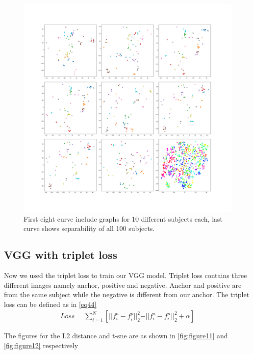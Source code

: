 \begin{figure}[htbp]
\centering
\includegraphics[scale=0.3]{./Chapter4/Figures/CLStsne_1}
\caption{First eight curve include graphs for 10 different subjects each, last curve shows separability of all 100 subjects.}
\label{fig:figure10}
\end{figure}

\subsection{VGG with triplet loss}
Now we used the triplet loss to train our VGG model. Triplet loss contains three different images namely anchor, positive and negative. Anchor and positive are from the same subject while the negative is different from our anchor. The triplet loss can be defined as in \ref{eq44}
\begin{equation}
	\begin{aligned}
		Loss = \sum^N_{i=1}[\vert\vert f^a_{i} - f^p_{i} \vert\vert^2_{2} - \vert\vert f^a_{i} - f^n_{i} \vert\vert^2_{2} + \alpha] 
\end{aligned}
\label{eq44}
\end{equation}

The figures for the L2 distance and t-sne are as shown in \ref{fig:figure11} and \ref{fig:figure12} respectively



